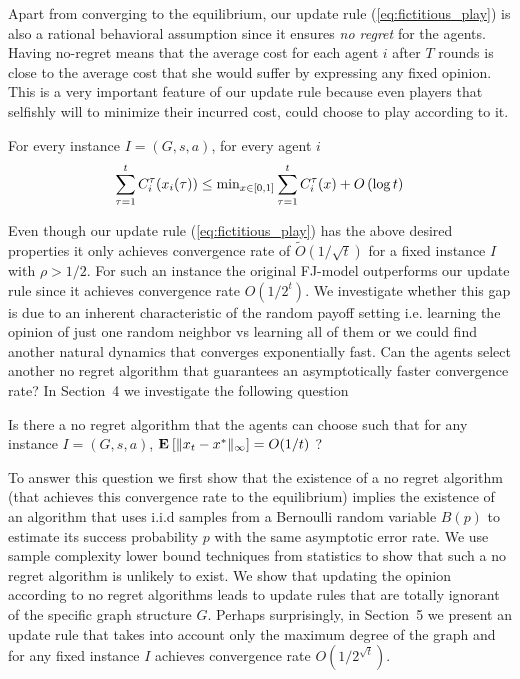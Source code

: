 Apart from converging to the equilibrium, our update rule
(\ref{eq:fictitious_play}) is also a rational behavioral
assumption since it ensures \emph{no regret} for the agents.
Having no-regret means that the average cost for each agent $i$
after $T$ rounds is close to the average cost that she would
suffer by expressing any fixed opinion. This is a very important
feature of our update rule because even players that selfishly
will to minimize their incurred cost, could choose to play according
to it.

\begin{theorem}

  For every instance $I=(G,s,a)$, for every agent $i$
  $$\sum_{\tau=1}^tC_i^\tau(x_i(\tau)) \leq \text{min}_{x \in
    [0,1]}\sum_{\tau=1}^tC_i^\tau(x) + O\left(\log t\right)$$

\end{theorem}

Even though our update rule (\ref{eq:fictitious_play}) has the above
desired properties it only achieves convergence rate of
$\widetilde{O}(1/\sqrt{t})$ for a fixed instance $I$ with
$\rho>1/2$.  For such an instance the original FJ-model outperforms
our update rule since it achieves convergence rate $O(1/2^{t})$.
We investigate whether this gap is due to an inherent characteristic
of the random payoff setting i.e. learning the opinion of just one random
neighbor vs learning all of them or we could find another natural dynamics
that converges exponentially fast. Can the agents select another no regret
algorithm that guarantees an asymptotically faster convergence rate?
In Section~4 we investigate the following question

\begin{question}
  Is there a no regret algorithm that the agents can choose such that
  for any instance $I = (G, s, a)$, $\Exp{\norm{\infty}{x_t - x^*}} = O(1/t)$ ?
\end{question}

To answer this question we first show that the existence of a no regret
algorithm (that achieves this convergence rate to the equilibrium) implies
the existence of an algorithm that uses i.i.d samples from a Bernoulli random
variable $B(p)$ to estimate its success probability $p$ with the same asymptotic
error rate. We use sample complexity lower bound techniques from statistics
to show that such a no regret algorithm is unlikely to exist.
We show that updating the opinion according to no regret algorithms leads
to update rules that are totally ignorant of the specific graph structure $G$.
Perhaps surprisingly, in Section~5 we present an update rule that takes
into account only the maximum degree of the graph and for any fixed instance $I$
achieves convergence rate $O(1/2^{\sqrt{t}})$.


